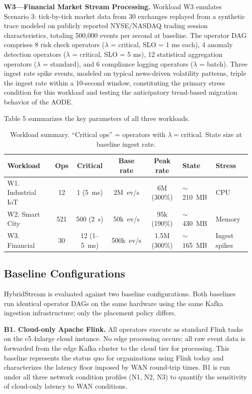 \documentclass[preprint,review,12pt]{elsarticle}
\begin{document}
\textbf{W3—Financial Market Stream Processing.} Workload W3 emulates Scenario 3: tick-by-tick market data from 30 exchanges replayed from a synthetic trace modeled on publicly reported NYSE/NASDAQ trading session characteristics, totaling 500,000 events per second at baseline. The operator DAG comprises 8 risk check operators ($\lambda$ = critical, SLO = 1 ms each), 4 anomaly detection operators ($\lambda$ = critical, SLO = 5 ms), 12 statistical aggregation operators ($\lambda$ = standard), and 6 compliance logging operators ($\lambda$ = batch). Three ingest rate spike events, modeled on typical news-driven volatility patterns, triple the ingest rate within a 10-second window, constituting the primary stress condition for this workload and testing the anticipatory trend-based migration behavior of the AODE.

Table 5 summarizes the key parameters of all three workloads.


\begin{table}[htbp]
\centering
\caption{Workload summary. ``Critical ops'' = operators with $\lambda = \text{critical}$. State size at baseline ingest rate.}
\label{tab:workloads}
\begin{tabular}{@{}lccccll@{}}
\toprule
Workload & Ops & Critical & Base rate & Peak rate & State & Stress \\
\midrule
W1. Industrial IoT & 12 & 1 (5~ms) & 2M~ev/s & 6M (300\%) & $\sim$210~MB & CPU \\
W2. Smart City & 521 & 500 (2~s) & 50k~ev/s & 95k (190\%) & $\sim$430~MB & Memory \\
W3. Financial & 30 & 12 (1--5~ms) & 500k~ev/s & 1.5M (300\%) & $\sim$165~MB & Ingest spikes \\
\bottomrule
\end{tabular}
\end{table}


\subsection{Baseline Configurations}\label{baseline-configurations}

HybridStream is evaluated against two baseline configurations. Both baselines run identical operator DAGs on the same hardware using the same Kafka ingestion infrastructure; only the placement policy differs.

\textbf{B1. Cloud-only Apache Flink.} All operators execute as standard Flink tasks on the c5.4xlarge cloud instance. No edge processing occurs; all raw event data is forwarded from the edge Kafka cluster to the cloud tier for processing. This baseline represents the status quo for organizations using Flink today and characterizes the latency floor imposed by WAN round-trip times. B1 is run under all three network condition profiles (N1, N2, N3) to quantify the sensitivity of cloud-only latency to WAN conditions.
\end{document}
